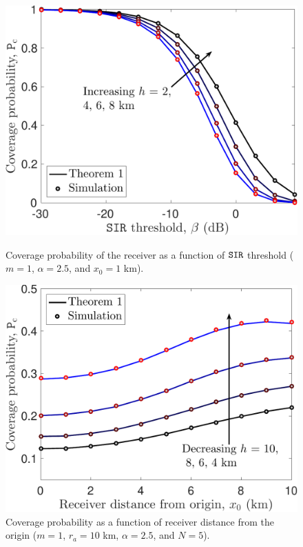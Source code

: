 \documentclass[journal,draftclsnofoot,onecolumn,12pt]{IEEEtran}
\begin{document}
\begin{figure}
\begin{minipage}{.49\textwidth}
\includegraphics[width=1\textwidth]{./impacth}
\caption{Coverage probability of the receiver as a function of $\mathtt{SIR}$ threshold ($m=1$, $\alpha = 2.5$, and $x_0= 1$ km).}
\label{fig:impacth}
\end{minipage}%
\hfill
\begin{minipage}{.49\textwidth}
\includegraphics[width=1\textwidth]{./impactx0}
\caption{Coverage probability as a function of receiver distance from the origin ($m=1$, $r_a = 10$ km, $\alpha=2.5$, and $N =5$).}
\label{fig:impactx0}
\end{minipage}
\end{figure} %
%
\end{document}
